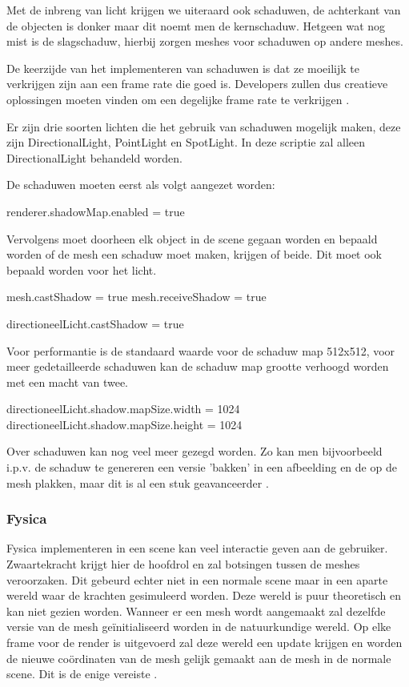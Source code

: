 Met de inbreng van licht krijgen we uiteraard ook schaduwen, de achterkant van de objecten is donker maar dit noemt men de kernschaduw. Hetgeen wat nog mist is de slagschaduw, hierbij zorgen meshes voor schaduwen op andere meshes.

De keerzijde van het implementeren van schaduwen is dat ze moeilijk te verkrijgen zijn aan een frame rate die goed is. Developers zullen dus creatieve oplossingen moeten vinden om een degelijke frame rate te verkrijgen \autocite{Simon2023}.

Er zijn drie soorten lichten die het gebruik van schaduwen mogelijk maken, deze zijn DirectionalLight, PointLight en SpotLight. In deze scriptie zal alleen DirectionalLight behandeld worden.

De schaduwen moeten eerst als volgt aangezet worden:

\begin{LVerbatim}
renderer.shadowMap.enabled = true
\end{LVerbatim}

Vervolgens moet doorheen elk object in de scene gegaan worden en bepaald worden of de mesh een schaduw moet maken, krijgen of beide. Dit moet ook bepaald worden voor het licht.

\begin{LVerbatim}
mesh.castShadow = true
mesh.receiveShadow = true

directioneelLicht.castShadow = true
\end{LVerbatim}

Voor performantie is de standaard waarde voor de schaduw map 512x512, voor meer gedetailleerde schaduwen kan de schaduw map grootte verhoogd worden met een macht van twee.

\begin{LVerbatim}
directioneelLicht.shadow.mapSize.width = 1024
directioneelLicht.shadow.mapSize.height = 1024
\end{LVerbatim}

Over schaduwen kan nog veel meer gezegd worden. Zo kan men bijvoorbeeld i.p.v. de schaduw te genereren een versie 'bakken' in een afbeelding en de op de mesh plakken, maar dit is al een stuk geavanceerder \autocite{Simon2023}.

\subsubsection{Fysica}

Fysica implementeren in een scene kan veel interactie geven aan de gebruiker. Zwaartekracht krijgt hier de hoofdrol en zal botsingen tussen de meshes veroorzaken. Dit gebeurd echter niet in een normale scene maar in een aparte wereld waar de krachten gesimuleerd worden. Deze wereld is puur theoretisch en kan niet gezien worden. Wanneer er een mesh wordt aangemaakt zal dezelfde versie van de mesh geïnitialiseerd worden in de natuurkundige wereld.
Op elke frame voor de render is uitgevoerd zal deze wereld een update krijgen en worden de nieuwe coördinaten van de mesh gelijk gemaakt aan de mesh in de normale scene. Dit is de enige vereiste \autocite{Simon2023}.

